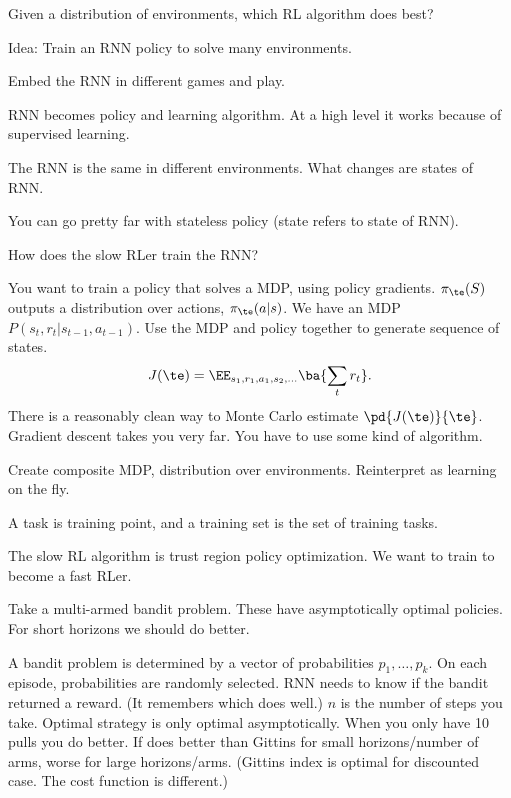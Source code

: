 Given a distribution of environments, which RL algorithm does best? 

Idea: Train an RNN policy to solve many environments.

Embed the RNN in different games and play.

RNN becomes policy and learning algorithm. 
At a high level it works because of supervised learning.

The RNN is the same in different environments. What changes are states of RNN.

You can go pretty far with stateless policy (state refers to state of RNN). 

How does the slow RLer train the RNN? 

You want to train a policy that solves a MDP, using policy gradients. $\pi_\te(S)$ outputs a distribution over actions, $\pi_\te(a|s)$. We have an MDP $P(s_t,r_t|s_{t-1},a_{t-1})$. Use the MDP and policy together to generate sequence of states. 
$$
J(\te) = \EE_{s_1,r_1,a_1,s_2,\ldots} \ba{\sum_t r_t}.
$$
There is a reasonably clean way to Monte Carlo estimate $\pd{J(\te)}{\te}$. %
Gradient descent takes you very far. You have to use some kind of algorithm.

Create composite MDP, distribution over environments. Reinterpret as learning on the fly.

A task is training point, and a training set is the set of training tasks.

The slow RL algorithm is trust region policy optimization.
We want to train to become a fast RLer.

Take a multi-armed bandit problem. These have asymptotically optimal policies. For short horizons we should do better. 

A bandit problem is determined by a vector of probabilities $p_1,\ldots, p_k$. On each episode, probabilities are randomly selected. RNN needs to know if the bandit returned a reward. (It remembers which does well.) $n$ is the number of steps you take. 
Optimal strategy is only optimal asymptotically. When you only have 10 pulls you do better.
If does better than Gittins for small horizons/number of arms, worse for large horizons/arms. (Gittins index is optimal for discounted case. The cost function is different.)

